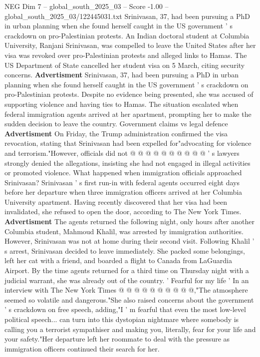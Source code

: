 \begin{textsample}{NEG Dim 7 – global\_south\_2025\_03 – Score -1.00 – global\_south\_2025\_03/122445031.txt}  \label{ex:f7_neg_022}
Srinivasan, 37, had been pursuing a PhD in urban planning when she found herself caught in the US government ' s crackdown on pro-Palestinian protests.
An Indian doctoral student at Columbia University, Ranjani Srinivasan, was compelled to leave the United States after her visa was revoked over pro-Palestinian protests and alleged links to Hamas.
The US Department of State cancelled her student visa on 5 March, citing security concerns. \textbf{Advertisment} Srinivasan, 37, had been pursuing a PhD in urban planning when she found herself caught in the US government ' s crackdown on pro-Palestinian protests.
Despite no evidence being presented, she was accused of supporting violence and having ties to Hamas.
The situation escalated when federal immigration agents arrived at her apartment, prompting her to make the sudden decision to leave the country.
Government claims vs legal defence \textbf{Advertisment} On Friday, the Trump administration confirmed the visa revocation, stating that Srinivasan had been expelled for"advocating for violence and terrorism."However, officials did not @ @ @ @ @ @ @ @ @ @ ' s lawyers strongly denied the allegations, insisting she had not engaged in illegal activities or promoted violence.
What happened when immigration officials approached Srinivasan?
Srinivasan ' s first run-in with federal agents occurred eight days before her departure when three immigration officers arrived at her Columbia University apartment.
Having recently discovered that her visa had been invalidated, she refused to open the door, according to The New York Times. \textbf{Advertisment} The agents returned the following night, only hours after another Columbia student, Mahmoud Khalil, was arrested by immigration authorities.
However, Srinivasan was not at home during their second visit.
Following Khalil ' s arrest, Srinivasan decided to leave immediately.
She packed some belongings, left her cat with a friend, and boarded a flight to Canada from LaGuardia Airport.
By the time agents returned for a third time on Thursday night with a judicial warrant, she was already out of the country. ' Fearful for my life ' In an interview with The New York Times @ @ @ @ @ @ @ @ @ @,"The atmosphere seemed so volatile and dangerous."She also raised concerns about the government ' s crackdown on free speech, adding,"I ' m fearful that even the most low-level political speech... can turn into this dystopian nightmare where somebody is calling you a terrorist sympathiser and making you, literally, fear for your life and your safety."Her departure left her roommate to deal with the pressure as immigration officers continued their search for her.

\end{textsample}
